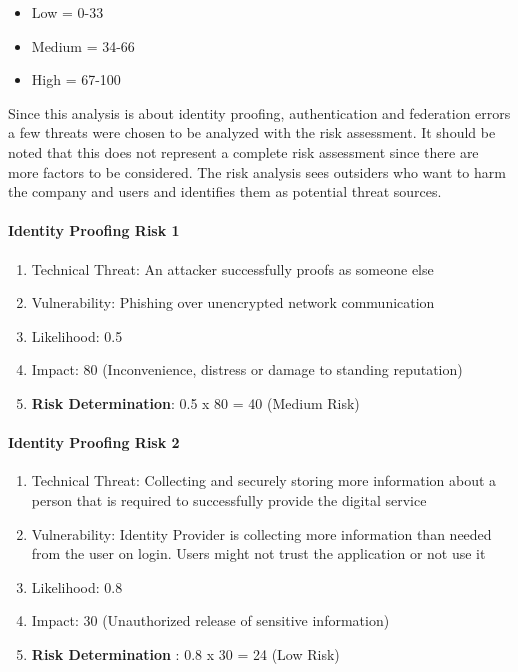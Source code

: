 \begin{itemize}
	\item Low =     0-33
	\item Medium = 34-66
	\item High =   67-100
\end{itemize}

Since this analysis is about identity proofing, authentication and federation errors a few threats were chosen to be analyzed with the risk assessment. It should be noted that this does not represent a complete risk assessment since there are more factors to be considered. The risk analysis sees outsiders who want to harm the company and users and identifies them as potential threat sources. 

\paragraph{Identity Proofing Risk 1}

\begin{enumerate}
	\item Technical Threat: An attacker successfully proofs as someone else
	\item Vulnerability: Phishing over unencrypted network communication
	\item Likelihood: 0.5
	\item Impact: 80 (Inconvenience, distress or damage to standing reputation)
	\item \textbf{Risk Determination}: 0.5 x 80 = 40 (Medium Risk) 
\end{enumerate}
\pagebreak[4]

\paragraph{Identity Proofing Risk 2}
\begin{enumerate}
	\item Technical Threat: Collecting and securely storing more information about a person that is required to successfully provide the digital service
	\item Vulnerability: Identity Provider is collecting more information than needed from the user on login. Users might not trust the application or not use it
	\item Likelihood: 0.8
	\item Impact: 30  (Unauthorized release of sensitive information)
	\item \textbf{Risk Determination} : 0.8 x 30 = 24 (Low Risk)
\end{enumerate}


